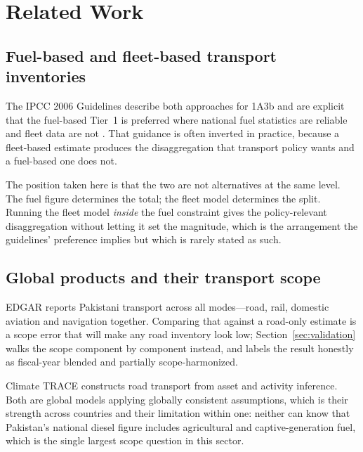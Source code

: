 \section{Related Work}
\label{sec:related}

\subsection{Fuel-based and fleet-based transport inventories}

The IPCC 2006 Guidelines describe both approaches for 1A3b and are explicit that the fuel-based
Tier~1 is preferred where national fuel statistics are reliable and fleet data are not
\citep{ipcc2006energy}. That guidance is often inverted in practice, because a fleet-based estimate
produces the disaggregation that transport policy wants and a fuel-based one does not.

The position taken here is that the two are not alternatives at the same level. The fuel
figure determines the total; the fleet model determines the split. Running the fleet model
\emph{inside} the fuel constraint gives the policy-relevant disaggregation without letting it
set the magnitude, which is the arrangement the guidelines' preference implies but which is
rarely stated as such.

\subsection{Global products and their transport scope}

EDGAR \citep{edgar2025booklet,crippa2020} reports Pakistani transport across all modes---road, rail,
domestic aviation and navigation together. Comparing that against a road-only estimate is a
scope error that will make any road inventory look low; Section~\ref{sec:validation} walks
the scope component by component instead, and labels the result honestly as fiscal-year blended
and partially scope-harmonized.

Climate TRACE \citep{climatetrace} constructs road transport from asset and activity
inference. Both are global models applying globally consistent assumptions, which is their
strength across countries and their limitation within one: neither can know that Pakistan's
national diesel figure includes agricultural and captive-generation fuel, which is the single
largest scope question in this sector.


